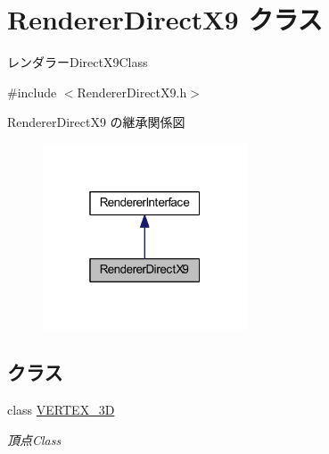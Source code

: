 \hypertarget{class_renderer_direct_x9}{}\section{Renderer\+Direct\+X9 クラス}
\label{class_renderer_direct_x9}


レンダラー\+Direct\+X9\+Class  




{\ttfamily \#include $<$Renderer\+Direct\+X9.\+h$>$}



Renderer\+Direct\+X9 の継承関係図\nopagebreak
\begin{figure}[H]
\begin{center}
\leavevmode
\includegraphics[width=172pt]{class_renderer_direct_x9__inherit__graph}
\end{center}
\end{figure}
\subsection*{クラス}
\begin{DoxyCompactItemize}
\item 
class \mbox{\hyperlink{class_renderer_direct_x9_1_1_v_e_r_t_e_x__3_d}{V\+E\+R\+T\+E\+X\+\_\+3D}}
\begin{DoxyCompactList}\small\item\em 頂点\+Class \end{DoxyCompactList}\end{DoxyCompactItemize}
